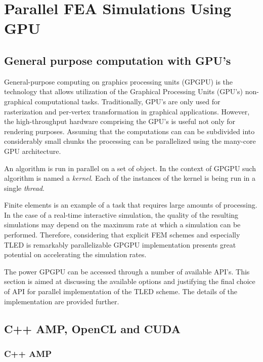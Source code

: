 \section{Parallel FEA Simulations Using GPU }\label{work-overview}

\subsection{General purpose computation with GPU's}

  General-purpose computing on graphics processing units (GPGPU) is the technology that allows utilization of the Graphical Processing Units (GPU's) non-graphical computational tasks. Traditionally, GPU's are only used for rasterization and per-vertex transformation in graphical applications. However, the high-throughput hardware comprising the GPU's is useful not only for rendering purposes. Assuming that the computations can can be subdivided into considerably small chunks the processing can be parallelized using the many-core GPU architecture.

  An algorithm is run in parallel on a set of object. In the context of GPGPU such algorithm is named a \textit{kernel}. Each of the instances of the kernel is being run in a single \textit{thread}.

  Finite elements is an example of a task that requires large amounts of processing. In the case of a real-time interactive simulation, the quality of the resulting simulations may depend on the maximum rate at which a simulation can be performed. Therefore, considering that explicit FEM schemes and especially TLED is remarkably parallelizable GPGPU implementation presents great potential on accelerating the simulation rates.

  The power GPGPU can be accessed through a number of available API's. This section is aimed at discussing the available options and justifying the final choice of API for parallel implementation of the TLED scheme. The details of the implementation are provided further.

\subsection{C++ AMP, OpenCL and CUDA}

  \subsubsection{C++ AMP}

